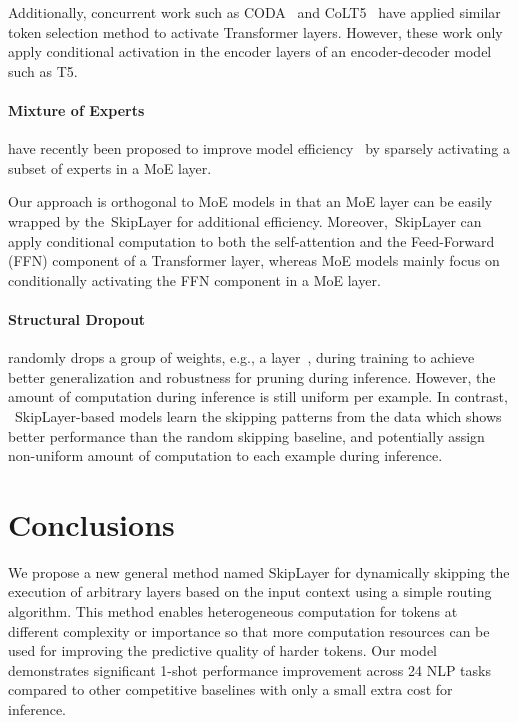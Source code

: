 \documentclass{article}
\newcommand{\skipl}{SkipLayer\xspace}
\begin{document}
Additionally, concurrent work such as CODA~\cite{lei2023conditional} and CoLT5~\cite{ainslie2023colt5} have applied similar token selection method to activate Transformer layers. However, these work only apply conditional activation in the encoder layers of an encoder-decoder model such as T5. 


\paragraph{Mixture of Experts} have recently been proposed to improve model efficiency~\cite{shazeer2017outrageously, gross2017hard, lepikhin2020gshard, fedus2021switch, rol21, du2022glam, art21, Lewis2021BASELS, zhou2022mixture, pmlr-v162-rajbhandari22a} by sparsely activating a subset of experts in a MoE layer.

Our approach is orthogonal to MoE models in that an MoE layer can be easily wrapped by the~\skipl for additional efficiency. Moreover,~\skipl can apply conditional computation to both the self-attention and the Feed-Forward (FFN) component of a Transformer layer, whereas MoE models mainly focus on conditionally activating the FFN component in a MoE layer.


\paragraph{Structural Dropout} \cite{tompson2015efficient, ghiasi2018dropblock, dai2019batch, fan2019reducing, zeng2021correlation} randomly drops a group of weights, e.g., a layer~\cite{fan2019reducing}, during training to achieve better generalization and robustness for pruning during inference. However, the amount of computation during inference is still uniform per example. In contrast, ~\skipl-based models learn the skipping patterns from the data which shows better performance than the random skipping baseline, and potentially assign non-uniform amount of computation to each example during inference. 

\section{Conclusions}
We propose a new general method named \skipl for dynamically skipping the execution of arbitrary layers based on the input context using a simple routing algorithm. This method enables heterogeneous computation for tokens at different complexity or importance so that more computation resources can be used for improving the predictive quality of harder tokens. Our model demonstrates significant 1-shot performance improvement across 24 NLP tasks compared to other competitive baselines with only a small extra cost for inference.




\clearpage
\end{document}
